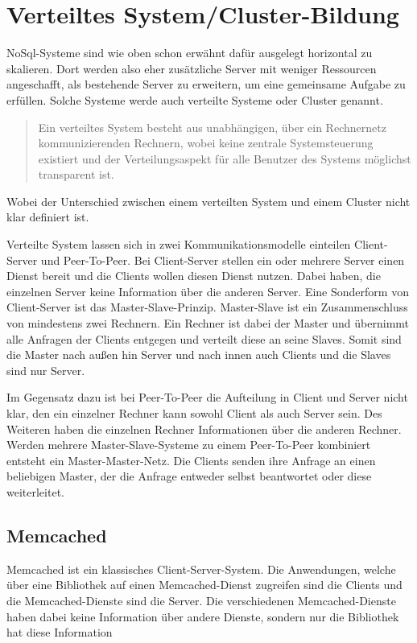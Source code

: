 \section{Verteiltes System/Cluster-Bildung}
NoSql-Systeme sind wie oben schon erwähnt dafür ausgelegt horizontal zu
skalieren. Dort werden also eher zusätzliche Server mit weniger Ressourcen
angeschafft, als bestehende Server zu erweitern, um eine gemeinsame Aufgabe zu
erfüllen. Solche Systeme werde auch verteilte Systeme oder Cluster genannt.

\blockquote[\cite{Distener2012}]{Ein verteiltes System besteht aus unabhängigen,
über ein Rechnernetz kommunizierenden Rechnern, wobei keine zentrale
Systemsteuerung existiert und der Verteilungsaspekt für alle Benutzer des
Systems möglichst transparent ist.}

Wobei der Unterschied zwischen einem verteilten System und einem Cluster
nicht klar definiert ist.

Verteilte System lassen sich in zwei Kommunikationsmodelle einteilen
Client-Server und Peer-To-Peer. Bei Client-Server stellen ein oder mehrere
Server einen Dienst bereit und die Clients wollen diesen Dienst nutzen. Dabei
haben, die einzelnen Server keine Information über die anderen Server. Eine
Sonderform von Client-Server ist das Master-Slave-Prinzip. Master-Slave ist ein
Zusammenschluss von mindestens zwei Rechnern. Ein Rechner ist dabei der Master
und übernimmt alle Anfragen der Clients entgegen und verteilt diese an seine
Slaves. Somit sind die Master nach außen hin Server und nach innen auch Clients
und die Slaves sind nur Server.

Im Gegensatz dazu ist bei Peer-To-Peer die Aufteilung in Client und Server
nicht klar, den ein einzelner Rechner kann sowohl Client als auch Server sein.
Des Weiteren haben die einzelnen Rechner Informationen über die anderen Rechner.
Werden mehrere Master-Slave-Systeme zu einem Peer-To-Peer kombiniert entsteht
ein Master-Master-Netz. Die Clients senden ihre Anfrage an einen beliebigen
Master, der die Anfrage entweder selbst beantwortet oder diese weiterleitet.

\subsection{Memcached}
Memcached ist ein klassisches Client-Server-System. Die Anwendungen, welche über
eine Bibliothek auf einen Memcached-Dienst zugreifen sind die Clients und die
Memcached-Dienste sind die Server. Die verschiedenen Memcached-Dienste haben
dabei keine Information über andere Dienste, sondern nur die Bibliothek hat
diese Information

